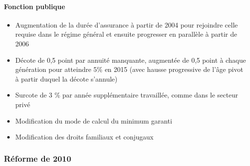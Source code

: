 \paragraph{Fonction publique}

\begin{itemize}
	\item	Augmentation de la durée d'assurance à partir de 2004 pour rejoindre celle requise dans le régime général et ensuite progresser en 
         parallèle à partir de 2006
	\item	Décote de 0,5 point par annuité manquante, augmentée de 0,5 point à chaque génération pour atteindre 5\% en 2015 (avec hausse 
         progressive de l'âge pivot à partir duquel la décote s'annule)
	\item	Surcote de 3 \% par année supplémentaire travaillée, comme dans le secteur privé
	\item	Modification du mode de calcul du minimum garanti
	\item	Modification des droits familiaux et conjugaux
\end{itemize}



\subsubsection{Réforme de 2010}

